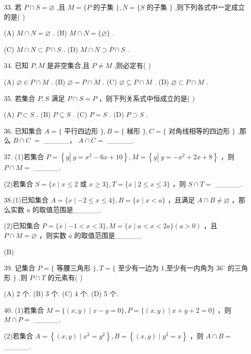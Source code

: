 \documentclass[10pt]{article}
\begin{document}
33. 若 \(P \cap  S = \varnothing\) ,且 \(M = \{ P\) 的子集 \(\} ,N = \{ S\) 的子集 \(\}\) ,则下列各式中一定成立的是(   )

(A) \(M \cap  N = \varnothing\) . (B) \(M \cap  N = \{ \varnothing \}\) .

(C) \(M \cap  N \subset  P \cap  S\) . (D) \(M \cap  N \supset  P \cap  S\) .

34. 已知 \(P,M\) 是非空集合,且 \(P \neq  M\) ,则必定有( )

(A) \(\varnothing  \in  P \cap  M\) . (B) \(\varnothing  = P \cap  M\) . (C) \(\varnothing  \subseteq  P \cap  M\) . (D) \(\varnothing  \subset  P \cap  M\) .

35. 若集合 \(P,S\) 满足 \(P \cap  S = P\) ，则下列关系式中恒成立的是( )

(A) \(P \subset  S\) . (B) \(P \subseteq  S\) . (C) \(P = S\) . (D) \(P \supset  S\) .

36. 已知集合 \(A = \{\) 平行四边形 \(\} ,B = \{\) 梯形 \(\} ,C = \{\) 对角线相等的四边形 \(\}\) ,那么 \(B \cap  C \; =\) \_\_\_\_\_， \(A \cap  C =\) \_\_\_\_\_.

37. (1)若集合 \(P = \left\{  {y\left| {\;y = {x}^{2} - {6x} + {10}}\right. }\right\}  ,M = \left\{  {y\left| {\;y =  - {x}^{2} + {2x} + 8}\right. }\right\}\) ，则 \(P \cap  M =\) \_\_\_\_\_.

(2)若集合 \(S = \{ x \mid  x \leq  2\) 或 \(x \geq  3\} ,T = \{ x \mid  2 \leq  x \leq  3\}\) ，则 \(S \cap  T =\) \_\_\_\_\_.

38.(1)已知集合 \(A = \{ x \mid   - 2 \leq  x \leq  4\} ,B = \{ x \mid  x < a\}\) ，且满足 \(A \cap  B \neq  \varnothing\) ，那么实数 \(a\) 的取值范围是\_\_\_\_\_.

(2)已知集合 \(P = \{ x \mid   - 1 < x < 3\} ,M = \{ x \mid  a < x < {2a}\} \left( {a > 0}\right)\) ，且 \(P \cap  M = \varnothing\) ，则实数 \(a\) 的取值范围是\_\_\_\_\_.

(B)

39. 记集合 \(P = \{\) 等腰三角形 \(\} ,T = \{\) 至少有一边为 1,至少有一内角为 \({36}^{ \circ  }\) 的三角形 \(\}\) ,则 \(P \cap  T\) 的元素有( )

(A) 2 个. (B) 3 个. (C) 4 个. (D) 5 个.

40. (1)若集合 \(M = \{ \left( {x,y}\right)  \mid  x - y = 0\} ,P = \{ \left( {x,y}\right)  \mid  x + y + 2 = 0\}\) ，则 \(M \cap  P =\) \_\_\_\_\_.

(2)若集合 \(A = \left\{  {\left( {x,y}\right)  \mid  {x}^{2} = {y}^{2}}\right\}  ,B = \left\{  {\left( {x,y}\right)  \mid  {y}^{2} = x}\right\}\) ，则 \(A \cap  B =\) \_\_\_\_\_.
\end{document}
